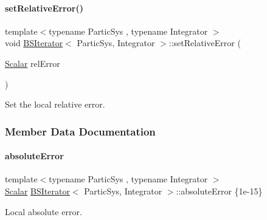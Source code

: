 \mbox{\label{class_b_s_iterator_ada9b6cc673e297135646699d581fcdc7}} 
\paragraph{\texorpdfstring{set\+Relative\+Error()}{setRelativeError()}}
{\footnotesize\ttfamily template$<$typename Partic\+Sys , typename Integrator $>$ \\
void \mbox{\hyperlink{class_b_s_iterator}{B\+S\+Iterator}}$<$ Partic\+Sys, Integrator $>$\+::set\+Relative\+Error (\begin{DoxyParamCaption}\item[{\mbox{\hyperlink{class_b_s_iterator_a7857f8ff9032955ea4dcc22cd18ca7a1}{Scalar}}}]{rel\+Error }\end{DoxyParamCaption})\hspace{0.3cm}{\ttfamily [inline]}}



Set the local relative error. 



\subsubsection{Member Data Documentation}
\mbox{\label{class_b_s_iterator_a8948aa04b0ec390d43eb3d1f0a2efb03}} 
\paragraph{\texorpdfstring{absolute\+Error}{absoluteError}}
{\footnotesize\ttfamily template$<$typename Partic\+Sys , typename Integrator $>$ \\
\mbox{\hyperlink{class_b_s_iterator_a7857f8ff9032955ea4dcc22cd18ca7a1}{Scalar}} \mbox{\hyperlink{class_b_s_iterator}{B\+S\+Iterator}}$<$ Partic\+Sys, Integrator $>$\+::absolute\+Error \{1e-\/15\}\hspace{0.3cm}{\ttfamily [private]}}



Local absolute error. 

\mbox{\label{class_b_s_iterator_a28f6cc2fd6bfd554f85225492f4210b7}} 

